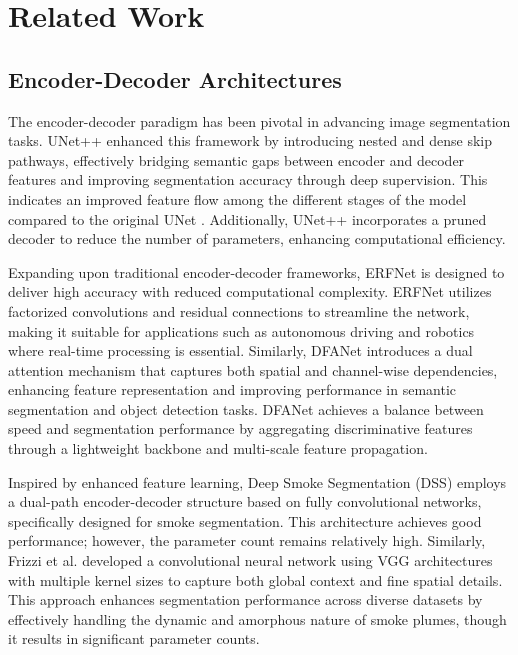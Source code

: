 \section{Related Work}
\subsection{Encoder-Decoder Architectures}

The encoder-decoder paradigm has been pivotal in advancing image segmentation tasks. UNet++ \cite{zhou2018unet++} enhanced this framework by introducing nested and dense skip pathways, effectively bridging semantic gaps between encoder and decoder features and improving segmentation accuracy through deep supervision. This indicates an improved feature flow among the different stages of the model compared to the original UNet \cite{ronneberger2015u}. Additionally, UNet++ incorporates a pruned decoder to reduce the number of parameters, enhancing computational efficiency.

Expanding upon traditional encoder-decoder frameworks, ERFNet \cite{romera2017erfnet} is designed to deliver high accuracy with reduced computational complexity. ERFNet utilizes factorized convolutions and residual connections to streamline the network, making it suitable for applications such as autonomous driving and robotics where real-time processing is essential. Similarly, DFANet \cite{li2019dfanet} introduces a dual attention mechanism that captures both spatial and channel-wise dependencies, enhancing feature representation and improving performance in semantic segmentation and object detection tasks. DFANet achieves a balance between speed and segmentation performance by aggregating discriminative features through a lightweight backbone and multi-scale feature propagation.

Inspired by enhanced feature learning, Deep Smoke Segmentation (DSS) \cite{yuan2019deep} employs a dual-path encoder-decoder structure based on fully convolutional networks, specifically designed for smoke segmentation. This architecture achieves good performance; however, the parameter count remains relatively high. Similarly, Frizzi et al. \cite{frizzi2021convolutional} developed a convolutional neural network using VGG architectures with multiple kernel sizes to capture both global context and fine spatial details. This approach enhances segmentation performance across diverse datasets by effectively handling the dynamic and amorphous nature of smoke plumes, though it results in significant parameter counts.

